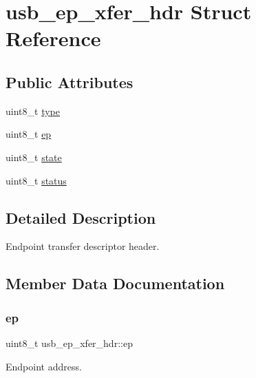 \hypertarget{structusb__ep__xfer__hdr}{}\section{usb\+\_\+ep\+\_\+xfer\+\_\+hdr Struct Reference}
\label{structusb__ep__xfer__hdr}
\subsection*{Public Attributes}
\begin{DoxyCompactItemize}
\item 
uint8\+\_\+t \hyperlink{structusb__ep__xfer__hdr_ae0bc7321662fd12afb1fe80095d15c38}{type}
\item 
uint8\+\_\+t \hyperlink{structusb__ep__xfer__hdr_a95eb9c2cb4339355d08adfcda564e24d}{ep}
\item 
uint8\+\_\+t \hyperlink{structusb__ep__xfer__hdr_a05b90ceda1751613c8e13e8eb7b1adb1}{state}
\item 
uint8\+\_\+t \hyperlink{structusb__ep__xfer__hdr_a192941949f60846a43669b6e72fa6617}{status}
\end{DoxyCompactItemize}


\subsection{Detailed Description}
Endpoint transfer descriptor header. 

\subsection{Member Data Documentation}
\mbox{\label{structusb__ep__xfer__hdr_a95eb9c2cb4339355d08adfcda564e24d}} 
\subsubsection{\texorpdfstring{ep}{ep}}
{\footnotesize\ttfamily uint8\+\_\+t usb\+\_\+ep\+\_\+xfer\+\_\+hdr\+::ep}

Endpoint address. \mbox{\label{structusb__ep__xfer__hdr_a05b90ceda1751613c8e13e8eb7b1adb1}} 

